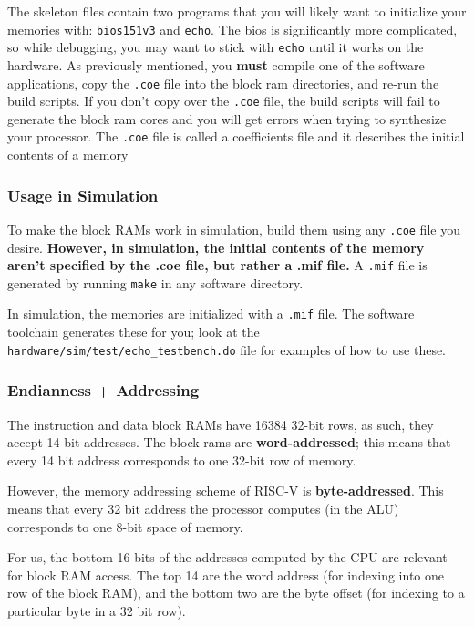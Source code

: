 \documentclass[11pt]{article}
\begin{document}
The skeleton files contain two programs that you will likely want to initialize your memories with: \verb|bios151v3| and \verb|echo|. The bios is significantly more complicated, so while debugging, you may want to stick with \verb|echo| until it works on the hardware. As previously mentioned, you \textbf{must} compile one of the software applications, copy the \verb|.coe| file into the block ram directories, and re-run the build scripts. If you don't copy over the \verb|.coe| file, the build scripts will fail to generate the block ram cores and you will get errors when trying to synthesize your processor. The \verb|.coe| file is called a coefficients file and it describes the initial contents of a memory

\subsubsection{Usage in Simulation}
To make the block RAMs work in simulation, build them using any \verb|.coe| file you desire. \textbf{However, in simulation, the initial contents of the memory aren't specified by the .coe file, but rather a .mif file.} A \verb|.mif| file is generated by running \verb|make| in any software directory.

In simulation, the memories are initialized with a \verb|.mif| file. The software toolchain generates these for you; look at the \verb|hardware/sim/test/echo_testbench.do| file for examples of how to use these.

\subsubsection{Endianness + Addressing}
The instruction and data block RAMs have 16384 32-bit rows, as such, they accept 14 bit addresses. The block rams are {\bf word-addressed}; this means that every 14 bit address corresponds to one 32-bit row of memory. 

However, the memory addressing scheme of RISC-V is {\bf byte-addressed}. This means that every 32 bit address the processor computes (in the ALU) corresponds to one 8-bit space of memory.

For us, the bottom 16 bits of the addresses computed by the CPU are relevant for block RAM access. The top 14 are the word address (for indexing into one row of the block RAM), and the bottom two are the byte offset (for indexing to a particular byte in a 32 bit row).
\end{document}
